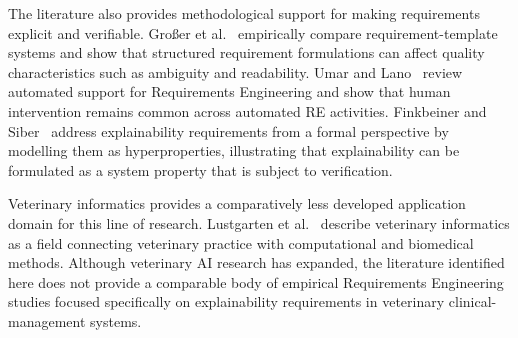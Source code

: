 \documentclass[pdflatex,sn-mathphys-num,Numbered]{sn-jnl}
\begin{document}
The literature also provides methodological support for making requirements explicit and verifiable. Großer et al.~\cite{grosser2024} empirically compare requirement-template systems and show that structured requirement formulations can affect quality characteristics such as ambiguity and readability. Umar and Lano~\cite{umar2024} review automated support for Requirements Engineering and show that human intervention remains common across automated RE activities. Finkbeiner and Siber~\cite{finkbeiner2025} address explainability requirements from a formal perspective by modelling them as hyperproperties, illustrating that explainability can be formulated as a system property that is subject to verification.

Veterinary informatics provides a comparatively less developed application domain for this line of research. Lustgarten et al.~\cite{lustgarten2020} describe veterinary informatics as a field connecting veterinary practice with computational and biomedical methods. Although veterinary AI research has expanded, the literature identified here does not provide a comparable body of empirical Requirements Engineering studies focused specifically on explainability requirements in veterinary clinical-management systems.
\end{document}
